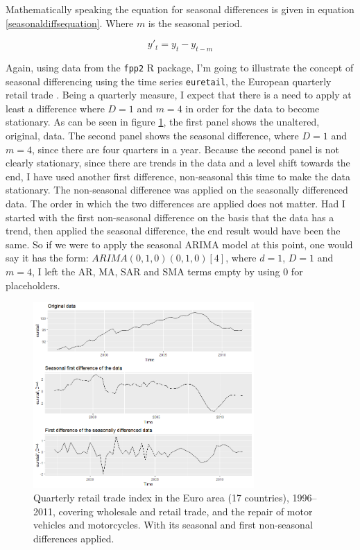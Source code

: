 \documentclass[12pt,a4paper,titlepage]{report}
\begin{document}
Mathematically speaking the equation for seasonal differences is given in equation \ref{seasonaldiffsequation}. Where $ m $ is the seasonal period.

\begin{equation}
y'_{t} = y_{t} - y_{t-m}
\label{seasonaldiffsequation}
\end{equation}

Again, using data from the \texttt{fpp2} R package, I'm going to illustrate the concept of seasonal differencing using the time series \texttt{euretail}, the European quarterly retail trade \cite{fpp2seasonalarima}. Being a quarterly measure, I expect that there is a need to apply at least a difference where $ D = 1 $ and $ m = 4 $ in order for the data to become stationary. As can be seen in figure \ref{euretaildiffs}, the first panel shows the unaltered, original, data. The second panel shows the seasonal difference, where $ D = 1 $ and $ m = 4 $, since there are four quarters in a year. Because the second panel is not clearly stationary, since there are trends in the data and a level shift towards the end, I have used another first difference, non-seasonal this time to make the data stationary. The non-seasonal difference was applied on the seasonally differenced data. The order in which the two differences are applied does not matter. Had I started with the first non-seasonal difference on the basis that the data has a trend, then applied the seasonal difference, the end result would have been the same. So if we were to apply the seasonal ARIMA model at this point, one would say it has the form: $ ARIMA(0, 1, 0)(0, 1, 0)[4] $, where $ d = 1 $, $ D = 1 $ and $ m = 4 $, I left the AR, MA, SAR and SMA terms empty by using $ 0 $ for placeholders.

\begin{figure}[h]
    \centering
    \includegraphics[width=0.75\textwidth]{deuretaildiffs}
    \caption{Quarterly retail trade index in the Euro area (17 countries), 1996–2011, covering wholesale and retail trade, and the repair of motor vehicles and motorcycles. With its seasonal and first non-seasonal differences applied.}
    \label{euretaildiffs}
\end{figure}
\end{document}
